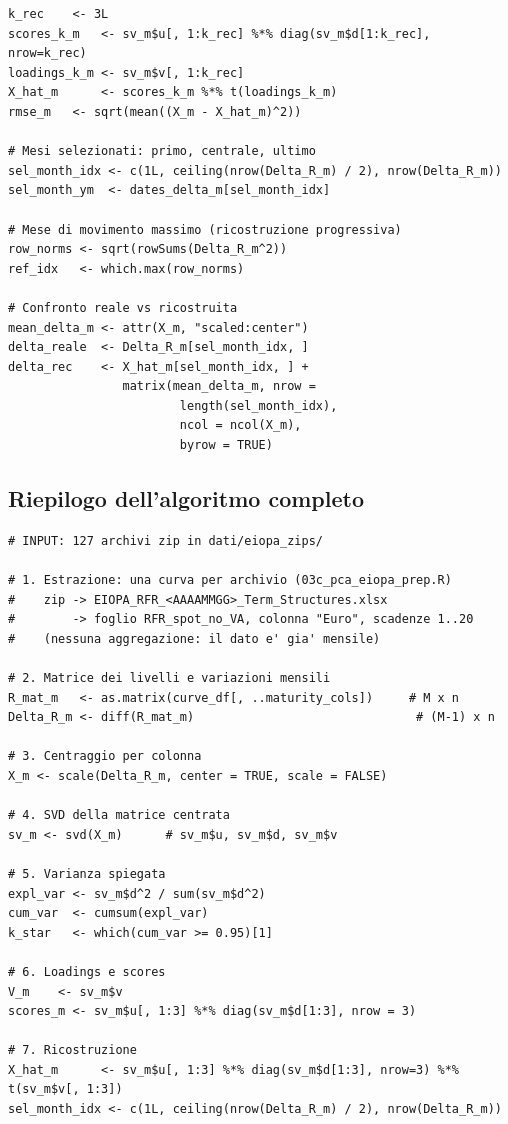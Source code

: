 \documentclass[11pt,a4paper]{article}
\theoremstyle{plain}
\theoremstyle{definition}
\theoremstyle{remark}
\begin{document}
\begin{codebox}
\begin{Verbatim}[fontsize=\small]
k_rec    <- 3L
scores_k_m   <- sv_m$u[, 1:k_rec] %*% diag(sv_m$d[1:k_rec], nrow=k_rec)
loadings_k_m <- sv_m$v[, 1:k_rec]
X_hat_m      <- scores_k_m %*% t(loadings_k_m)
rmse_m   <- sqrt(mean((X_m - X_hat_m)^2))

# Mesi selezionati: primo, centrale, ultimo
sel_month_idx <- c(1L, ceiling(nrow(Delta_R_m) / 2), nrow(Delta_R_m))
sel_month_ym  <- dates_delta_m[sel_month_idx]

# Mese di movimento massimo (ricostruzione progressiva)
row_norms <- sqrt(rowSums(Delta_R_m^2))
ref_idx   <- which.max(row_norms)

# Confronto reale vs ricostruita
mean_delta_m <- attr(X_m, "scaled:center")
delta_reale  <- Delta_R_m[sel_month_idx, ]
delta_rec    <- X_hat_m[sel_month_idx, ] +
                matrix(mean_delta_m, nrow =
                        length(sel_month_idx),
                        ncol = ncol(X_m),
                        byrow = TRUE)
\end{Verbatim}
\end{codebox}

\subsection{Riepilogo dell'algoritmo completo}

\begin{algobox}
\begin{Verbatim}[fontsize=\small]
# INPUT: 127 archivi zip in dati/eiopa_zips/

# 1. Estrazione: una curva per archivio (03c_pca_eiopa_prep.R)
#    zip -> EIOPA_RFR_<AAAAMMGG>_Term_Structures.xlsx
#        -> foglio RFR_spot_no_VA, colonna "Euro", scadenze 1..20
#    (nessuna aggregazione: il dato e' gia' mensile)

# 2. Matrice dei livelli e variazioni mensili
R_mat_m   <- as.matrix(curve_df[, ..maturity_cols])     # M x n
Delta_R_m <- diff(R_mat_m)                               # (M-1) x n

# 3. Centraggio per colonna
X_m <- scale(Delta_R_m, center = TRUE, scale = FALSE)

# 4. SVD della matrice centrata
sv_m <- svd(X_m)      # sv_m$u, sv_m$d, sv_m$v

# 5. Varianza spiegata
expl_var <- sv_m$d^2 / sum(sv_m$d^2)
cum_var  <- cumsum(expl_var)
k_star   <- which(cum_var >= 0.95)[1]

# 6. Loadings e scores
V_m    <- sv_m$v
scores_m <- sv_m$u[, 1:3] %*% diag(sv_m$d[1:3], nrow = 3)

# 7. Ricostruzione
X_hat_m      <- sv_m$u[, 1:3] %*% diag(sv_m$d[1:3], nrow=3) %*% t(sv_m$v[, 1:3])
sel_month_idx <- c(1L, ceiling(nrow(Delta_R_m) / 2), nrow(Delta_R_m))
\end{Verbatim}
\end{algobox}
\end{document}
